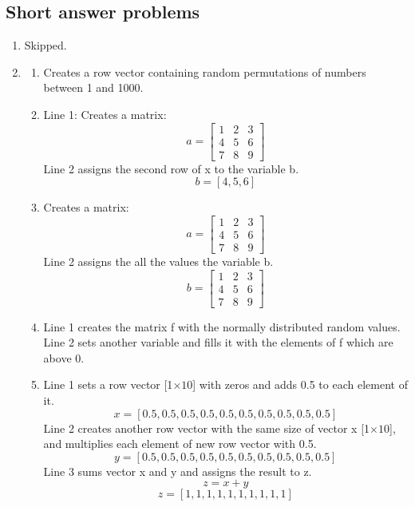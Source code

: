\documentclass[man]{apa6}
\begin{document}
\subsection{Short answer problems}
	\begin{enumerate}
		\item Skipped.
		
		\item 
			\begin{enumerate}
				\item Creates a row vector containing random permutations of numbers between 1 and 1000.
				
				\item Line 1: Creates a matrix: \\
					\[ a= \left[ \begin{array}{ccc}
					1 & 2 & 3 \\
					4 & 5 & 6 \\
					7 & 8 & 9 \end{array} \right]\] 
					Line 2 assigns the second row of x to the variable b.
					$$ b = [4,5,6]$$

				\item Creates a matrix: \\
					\[ a= \left[ \begin{array}{ccc}
					1 & 2 & 3 \\
					4 & 5 & 6 \\
					7 & 8 & 9 \end{array} \right]\] 
					Line 2 assigns the all the values the variable b.
					\[ b= \left[ \begin{array}{ccc}
					1 & 2 & 3 \\
					4 & 5 & 6 \\
					7 & 8 & 9 \end{array} \right]\] 

				\item Line 1 creates the matrix f with the normally distributed random values. \\
					Line 2 sets another variable and fills it with the elements of f which are above 0.

				\item Line 1 sets a row vector  [1$\times10$] with zeros and adds 0.5 to each element of it.
					$$x= [0.5,0.5,0.5,0.5,0.5,0.5,0.5,0.5,0.5,0.5]$$
					Line 2 creates another row vector with the same size of vector x [1$\times10$], and multiplies each element of new row vector with 0.5. \\
					$$y= [0.5,0.5,0.5,0.5,0.5,0.5,0.5,0.5,0.5,0.5]$$
					Line 3 sums vector x and y and assigns the result to z.
					$$z = x + y$$
					$$z= [1,1,1,1,1,1,1,1,1,1]$$
					

\end{enumerate}
\end{enumerate}
\end{document}
